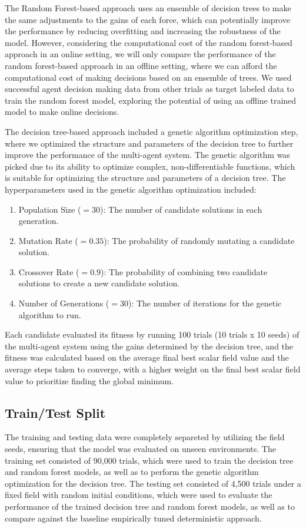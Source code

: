 \documentclass[11pt]{article}
\begin{document}
The Random Forest-based approach uses an ensemble of decision trees to make the same adjustments to the gains of each force, which can potentially improve the performance by reducing overfitting and increasing the robustness of the model.
However, considering the computational cost of the random forest-based approach in an online setting, we will only compare the performance of the random forest-based approach in an offline setting, where we can afford the computational cost of making decisions based on an ensemble of trees.
We used successful agent decision making data from other trials as target labeled data to train the random forest model, exploring the potential of using an offline trained model to make online decisions.

The decision tree-based approach included a genetic algorithm optimization step, where we optimized the structure and parameters of the decision tree to further improve the performance of the multi-agent system.
The genetic algorithm was picked due to its ability to optimize complex, non-differentiable functions, which is suitable for optimizing the structure and parameters of a decision tree.
The hyperparameters used in the genetic algorithm optimization included:
\begin{enumerate}
    \item Population Size ($=30$): The number of candidate solutions in each generation.
    \item Mutation Rate ($=0.35$): The probability of randomly mutating a candidate solution.
    \item Crossover Rate ($=0.9$): The probability of combining two candidate solutions to create a new candidate solution.
    \item Number of Generations ($=30$): The number of iterations for the genetic algorithm to run.
\end{enumerate}

Each candidate evaluated its fitness by running 100 trials (10 trials x 10 seeds) of the multi-agent system using the gains determined by the decision tree, and the fitness was calculated based on the average final best scalar field value and the average steps taken to converge, with a higher weight on the final best scalar field value to prioritize finding the global minimum.
\subsection{Train/Test Split}

The training and testing data were completely separeted by utilizing the field seeds, ensuring that the model was evaluated on unseen environments.
The training set consisted of 90,000 trials, which were used to train the decision tree and random forest models, as well as to perform the genetic algorithm optimization for the decision tree.
The testing set consisted of 4,500 trials under a fixed field with random initial conditions, which were used to evaluate the performance of the trained decision tree and random forest models, as well as to compare against the baseline empirically tuned deterministic approach.
\end{document}
